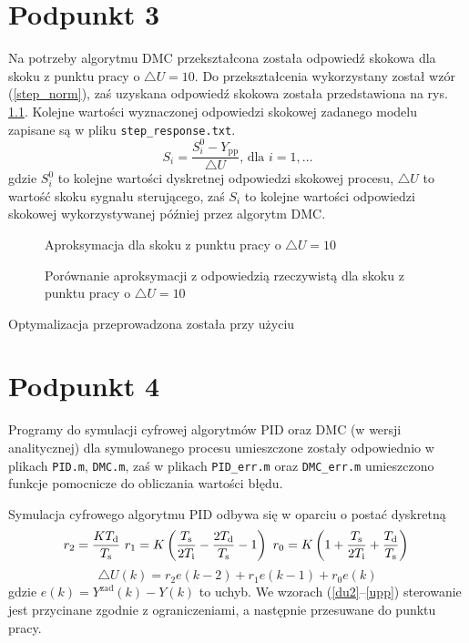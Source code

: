 \chapter{Podpunkt 3}
Na potrzeby algorytmu DMC przekształcona została odpowiedź skokowa dla skoku z punktu pracy o $\triangle U = 10$. Do przekształcenia wykorzystany został wzór (\ref{step_norm}), zaś uzyskana odpowiedź skokowa została przedstawiona na rys. \ref{R2}. Kolejne wartości wyznaczonej odpowiedzi skokowej zadanego modelu zapisane są w pliku \verb+step_response.txt+.
\begin{equation}
S_i = \frac{S_i^0 - Y_{\mathrm{pp}}}{\triangle U} \textrm{, dla } i=1,\ldots
\label{step_norm}
\end{equation}
gdzie $S_i^0$ to kolejne wartości dyskretnej odpowiedzi skokowej procesu, $\triangle U$ to wartość skoku sygnału sterującego, zaś $S_i$ to kolejne wartości odpowiedzi skokowej wykorzystywanej później przez algorytm DMC.

\begin{figure}[ht]
\centering

\caption{Aproksymacja dla skoku z punktu pracy o $\triangle U = 10$}
\label{R2}
\end{figure}

\begin{figure}[ht]
\centering

\caption{Porównanie aproksymacji z odpowiedzią rzeczywistą dla skoku z punktu pracy o $\triangle U = 10$}
\label{R3}
\end{figure}

Optymalizacja przeprowadzona została przy użyciu 

\chapter{Podpunkt 4}
Programy do symulacji cyfrowej algorytmów PID oraz DMC (w wersji analitycznej) dla symulowanego procesu umieszczone zostały odpowiednio w plikach \verb+PID.m+, \verb+DMC.m+, zaś w plikach \verb+PID_err.m+ oraz \verb+DMC_err.m+ umieszczono funkcje pomocnicze do obliczania wartości błędu.









Symulacja cyfrowego algorytmu PID odbywa się w oparciu o postać dyskretną
\begin{equation}
r_2 = \frac{K T_{\mathrm{d}}}{T_{\mathrm{s}}} \
r_1 = K \left( \frac{T_{\mathrm{s}}}{2 T_{\mathrm{i}}} - \frac{2 T_{\mathrm{d}}}{T_{\mathrm{s}}} - 1 \right) \
r_0 = K \left( 1 + \frac{T_{\mathrm{s}}}{2 T_{\mathrm{i}}} + \frac{T_{\mathrm{d}}}{T_{\mathrm{s}}} \right) \\
\label{r_t}
\end{equation}
\begin{equation}
\triangle U(k) = r_2 e(k-2) + r_1 e(k-1) + r_0 e(k)
\label{du}
\end{equation}
gdzie $e(k)=Y^{\mathrm{zad}}(k) - Y(k)$ to uchyb. We wzorach (\ref{du2}--\ref{upp}) sterowanie jest przycinane zgodnie z ograniczeniami, a następnie przesuwane do punktu pracy.

